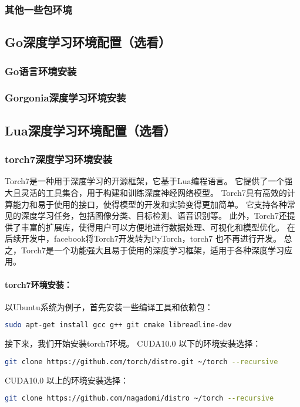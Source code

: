 \documentclass[lang=cn,a4paper,newtx]{elegantpaper}
\begin{document}
\subsubsection{其他一些包环境}
\subsection{Go深度学习环境配置（选看）}
\subsubsection{Go语言环境安装}
\subsubsection{Gorgonia深度学习环境安装}
\subsection{Lua深度学习环境配置（选看）}
\subsubsection{torch7深度学习环境安装}
Torch7是一种用于深度学习的开源框架，它基于Lua编程语言。
它提供了一个强大且灵活的工具集合，用于构建和训练深度神经网络模型。
Torch7具有高效的计算能力和易于使用的接口，使得模型的开发和实验变得更加简单。
它支持各种常见的深度学习任务，包括图像分类、目标检测、语音识别等。
此外，Torch7还提供了丰富的扩展库，使得用户可以方便地进行数据处理、可视化和模型优化。
在后续开发中，facebook将Torch7开发转为PyTorch，torch7 也不再进行开发。
总之，Torch7是一个功能强大且易于使用的深度学习框架，适用于各种深度学习应用。
\paragraph{torch7环境安装：}
以Ubuntu系统为例子，首先安装一些编译工具和依赖包：
\begin{lstlisting}[language=bash]
sudo apt-get install gcc g++ git cmake libreadline-dev 
\end{lstlisting}

接下来，我们开始安装torch7环境。
CUDA10.0 以下的环境安装选择：
\begin{lstlisting}[language=bash]
  git clone https://github.com/torch/distro.git ~/torch --recursive
\end{lstlisting}

CUDA10.0 以上的环境安装选择：
\begin{lstlisting}[language=bash]
  git clone https://github.com/nagadomi/distro ~/torch --recursive
\end{lstlisting}
\end{document}

